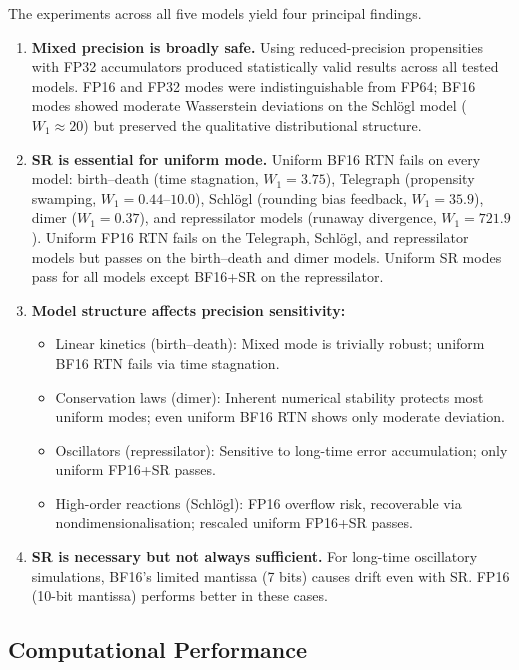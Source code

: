 \documentclass{article}
\begin{document}
The experiments across all five models yield four principal findings.
\begin{enumerate}
    \item \textbf{Mixed precision is broadly safe.} Using reduced-precision propensities with FP32 accumulators produced statistically valid results across all tested models. FP16 and FP32 modes were indistinguishable from FP64; BF16 modes showed moderate Wasserstein deviations on the Schl\"{o}gl model ($W_1 \approx 20$) but preserved the qualitative distributional structure.
    \item \textbf{SR is essential for uniform mode.} Uniform BF16 RTN fails on every model: birth--death (time stagnation, $W_1 = 3.75$), Telegraph (propensity swamping, $W_1 = 0.44$--$10.0$), Schl\"{o}gl (rounding bias feedback, $W_1 = 35.9$), dimer ($W_1 = 0.37$), and repressilator models (runaway divergence, $W_1 = 721.9$). Uniform FP16 RTN fails on the Telegraph, Schl\"{o}gl, and repressilator models but passes on the birth--death and dimer models. Uniform SR modes pass for all models except BF16+SR on the repressilator.
    \item \textbf{Model structure affects precision sensitivity:}
    \begin{itemize}
        \item Linear kinetics (birth--death): Mixed mode is trivially robust; uniform BF16 RTN fails via time stagnation.
        \item Conservation laws (dimer): Inherent numerical stability protects most uniform modes; even uniform BF16 RTN shows only moderate deviation.
        \item Oscillators (repressilator): Sensitive to long-time error accumulation; only uniform FP16+SR passes.
        \item High-order reactions (Schl\"{o}gl): FP16 overflow risk, recoverable via nondimensionalisation; rescaled uniform FP16+SR passes.
    \end{itemize}
    \item \textbf{SR is necessary but not always sufficient.} For long-time oscillatory simulations, BF16's limited mantissa (7 bits) causes drift even with SR. FP16 (10-bit mantissa) performs better in these cases.
\end{enumerate}

\subsection{Computational Performance}
\end{document}

